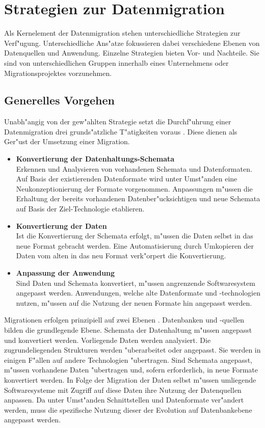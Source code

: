 \section{Strategien zur Datenmigration}

Als Kernelement der Datenmigration stehen unterschiedliche Strategien zur Verf"ugung. Unterschiedliche Ans"atze fokussieren dabei verschiedene Ebenen von Datenquellen und Anwendung. Einzelne Strategien bieten Vor- und Nachteile. Sie sind von unterschiedlichen Gruppen innerhalb eines Unternehmens oder Migrationsprojektes vorzunehmen.

\subsection{Generelles Vorgehen}

Unabh"angig von der gew"ahlten Strategie setzt die Durchf"uhrung einer Datenmigration drei grunds"atzliche T"atigkeiten voraus \citep{henrard-2002}. Diese dienen als Ger"ust der Umsetzung einer Migration. 

\begin{itemize}
	\item \textbf{Konvertierung der Datenhaltungs-Schemata} \\
	Erkennen und Analysieren von vorhandenen Schemata und Datenformaten. Auf Basis der existierenden Datenformate wird unter Umst"anden eine Neukonzeptionierung der Formate vorgenommen. Anpassungen m"ussen die Erhaltung der bereits vorhandenen Datenber"ucksichtigen und neue Schemata auf Basis der Ziel-Technologie etablieren.
	\item \textbf{Konvertierung der Daten} \\
	Ist die Konvertierung der Schemata erfolgt, m"ussen die Daten selbst in das neue Format gebracht werden. Eine Automatisierung durch Umkopieren der Daten vom alten in das neu Format verk"orpert die Konvertierung.
	\item \textbf{Anpassung der Anwendung} \\
	Sind Daten und Schemata konvertiert, m"ussen angrenzende Softwaresystem angepasst werden. Anwendungen, welche alte Datenformate und -technologien nutzen, m"ussen auf die Nutzung der neuen Formate hin angepasst werden.
\end{itemize}

Migrationen erfolgen prinzipiell auf zwei Ebenen \citep{henrard-2002}. Datenbanken und -quellen bilden die grundlegende Ebene. Schemata der Datenhaltung m"ussen angepasst und konvertiert werden. Vorliegende Daten werden analysiert. Die zugrundeliegenden Strukturen werden "uberarbeitet oder angepasst. Sie werden in einigen F"allen auf andere Technologien "ubertragen. Sind Schemata angepasst, m"ussen vorhandene Daten "ubertragen und, sofern erforderlich, in neue Formate konvertiert werden.
\lb
In Folge der Migration der Daten selbst m"ussen umliegende Softwaresysteme mit Zugriff auf diese Daten ihre Nutzung der Datenquellen anpassen. Da unter Umst"anden Schnittstellen und Datenformate ver"andert werden, muss die spezifische Nutzung dieser der Evolution auf Datenbankebene angepasst werden. 

